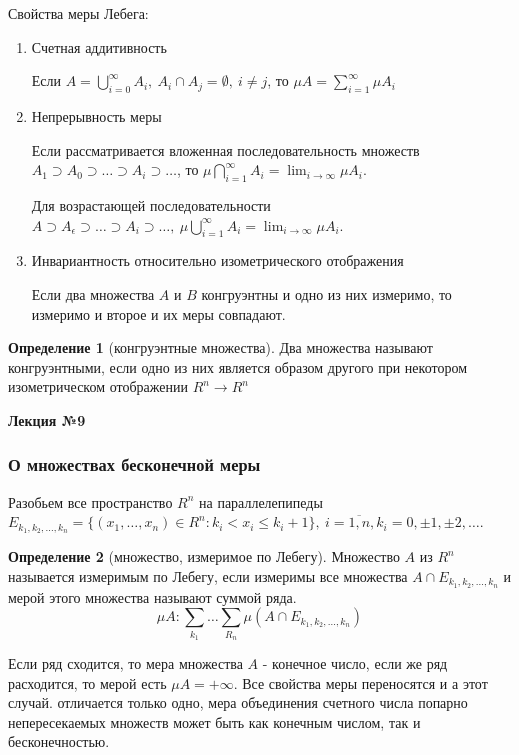 \documentclass[14pt,a4paper]{extarticle}
\theoremstyle{definition}
\newtheorem{definition}{Определение}[section]
\theoremstyle{remark}
\renewcommand{\[}{\begin{dmath*}[compact]}
\renewcommand{\]}{\end{dmath*}}
\newcommand{\be}{\begin{enumerate}}
\newcommand{\ee}{\end{enumerate}}
\newcommand{\ds}{\displaystyle}
\newcommand{\sep}{ , \ \allowbreak }
\begin{document}
Свойства меры Лебега:
\be
  \item Счетная аддитивность

  Если $\ds A=\bigcup _{i=0}^\infty A_i\sep A_i\cap A_j=\emptyset\sep i\neq j$,
  то $\ds\mu A=\sum_{i=1}^\infty \mu A_i$

  \item Непрерывность меры

  Если рассматривается вложенная последовательность множеств
  $A_1 \supset A_0 \supset \dots \supset A_i \supset \dots$,
  то $\ds\mu\bigcap _{i=1}^\infty A_i=\lim_{i \to \infty} \mu A_i $.

  Для возрастающей последовательности
  $\ds A \supset A _ \epsilon \supset \dots \supset A_i \supset \dots \sep
  \mu \bigcup _ {i = 1}  ^ \infty A_i = \lim_{i \to \infty} \mu A_i$.

  \item Инвариантность относительно изометрического отображения

  Если два множества $A$ и $B$ конгруэнтны и одно из них измеримо,
  то измеримо и второе и их меры совпадают.
\ee

\begin{definition}[конгруэнтные множества]
  Два множества называют конгруэнтными, если одно из них является
  образом другого при некотором изометрическом отображении $R^n \to R^n$
\end{definition}

\textbf{Лекция №9}

\subsubsection{О множествах бесконечной меры}

Разобьем все пространство $R^n$ на параллелепипеды
$E_{k_1,k_2,\dots,k_n}=\{(x_1,\dots,x_n) \in R^n:k_i<x_i \leq k_i+1 \} \sep
i=\overline{1,n}, k_i=0, \pm 1, \pm 2, \dots$.

\begin{definition}[множество, измеримое по Лебегу]
  Множество $A$ из $R^n$ называется измеримым по Лебегу,
  если измеримы все множества $A \cap E_{k_1,k_2,\dots,k_n}$
  и мерой этого множества называют суммой ряда.
  \[\mu A: \sum_{k_1} \dots \sum_{R_n} \mu (A \cap E_{k_1,k_2,\dots,k_n})\]
\end{definition}

Если ряд сходится, то мера множества $A$ - конечное число,
если же ряд расходится, то мерой есть $\mu A = + \infty$.
Все свойства меры переносятся и а этот случай. отличается только одно,
мера объединения счетного числа попарно непересекаемых множеств может быть
как конечным числом, так и бесконечностью.
\end{document}
